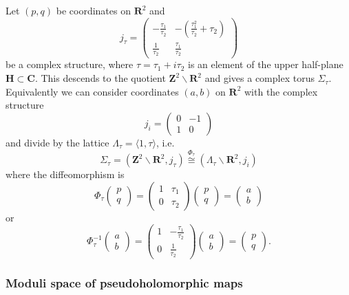 \documentclass[11pt]{amsart}
\newcommand{\HH}{\mathbf{H}}
\newcommand{\CC}{\mathbf{C}}
\newcommand{\RR}{\mathbf{R}}
\newcommand{\ZZ}{\mathbf{Z}}
\newcommand{\torus}{\ZZ^2\backslash\RR^2}
\numberwithin{equation}{section}
\theoremstyle{definition}
\theoremstyle{remark}
\begin{document}
Let $(p,q)$ be coordinates on $\RR^2$ and
\[j_{\tau}=\left(\begin{array}{cc}
-\frac{\tau_1}{\tau_2} & -\left(\frac{\tau_1^2}{\tau_2}+\tau_2\right)\\
\frac{1}{\tau_2} & \frac{\tau_1}{\tau_2}
\end{array}\right)\]
be a complex structure, where $\tau=\tau_1+i\tau_2$ is an element of
the upper half-plane $\HH\subset \CC$. This descends to the quotient
$\torus$ and gives a complex torus $\Sigma_{\tau}$. Equivalently
we can consider coordinates $(a,b)$ on $\RR^2$ with the complex
structure
\[j_i=\left(\begin{array}{cc}
0 & -1\\
1 & 0
\end{array}\right)\]
and divide by the lattice $\Lambda_{\tau}=\langle1,\tau\rangle$, i.e.
\[\Sigma_{\tau}=(\torus,j_{\tau})\stackrel{\Phi_{\tau}}{\cong}(\Lambda_{\tau}\backslash\RR^2,j_{i})\]
where the diffeomorphism is
\[\Phi_{\tau}\left(\begin{array}{c}p \\ q\end{array}\right)=\left(\begin{array}{cc}
1 & \tau_1\\
0 & \tau_2
\end{array}
\right)\left(\begin{array}{c}
p\\
q
\end{array}\right)=\left(\begin{array}{c}
a\\
b
\end{array}\right)\]
or
\[\Phi_{\tau}^{-1}\left(\begin{array}{c}a \\ b\end{array}\right)=\left(\begin{array}{cc}
1 & -\frac{\tau_1}{\tau_2}\\
0 & \frac{1}{\tau_2}
\end{array}
\right)\left(\begin{array}{c}
a\\
b
\end{array}\right)=\left(\begin{array}{c}
p\\
q
\end{array}\right).\]

\subsubsection{Moduli space of pseudoholomorphic maps}
\end{document}
